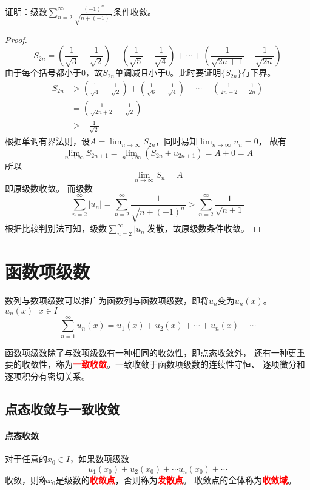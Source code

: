 \begin{example}
    证明：级数$\displaystyle\sum_{n=2}^\infty \frac{(-1)^n}{\sqrt{n + (-1)^n}}$条件收敛。
\end{example}
\begin{proof}
    \[
        S_{2n}
        = \left(\frac{1}{\sqrt{3}} - \frac{1}{\sqrt{2}}\right)
        + \left(\frac{1}{\sqrt{5}}-\frac{1}{\sqrt{4}}\right)
        + \cdots
        + \left(\frac{1}{\sqrt{2n+1}} - \frac{1}{\sqrt{2n}}\right)
    \]
    由于每个括号都小于$0$，故$S_{2n}$单调减且小于$0$。此时要证明$\{S_{2n}\}$有下界。
    \begin{align*}
        S_{2n}
         & > \left(\frac{1}{\sqrt{4}} - \frac{1}{\sqrt{2}}\right)
        + \left(\frac{1}{\sqrt{6}}-\frac{1}{\sqrt{4}}\right)
        + \cdots
        + \left(\frac{1}{2n+2} - \frac{1}{2n}\right)              \\
         & =
        \left(\frac{1}{\sqrt{2n+2}} - \frac{1}{\sqrt{2}}\right)   \\
         & > -\frac{1}{\sqrt{2}}
    \end{align*}
    根据单调有界法则，设$\displaystyle A = \lim_{n\to\infty} S_{2n}$，同时易知$\displaystyle \lim_{n\to\infty} u_n = 0$，
    故有
    \[ \lim_{n\to\infty} S_{2n+1} = \lim_{n\to\infty} (S_{2n} +u_{2n+1}) = A + 0 = A \]
    所以
    \[ \lim_{n\to\infty} S_n = A \]
    即原级数收敛。
    而级数
    \[
        \sum_{n=2}^\infty |u_n|
        =
        \sum_{n=2}^\infty \frac{1}{\sqrt{n+(-1)^n}}
        >
        \sum_{n=2}^\infty \frac{1}{\sqrt{n+1}}
    \]
    根据比较判别法可知，级数$\displaystyle\sum_{n=2}^\infty |u_n|$发散，故原级数条件收敛。
\end{proof}

\section{函数项级数}
数列与数项级数可以推广为函数列与函数项级数，即将$u_n$变为$u_n(x)$。${u_n(x)\,|\,x\in I}$
\[ \sum_{n=1}^\infty u_n(x) = u_1(x) + u_2(x) + \cdots + u_n(x) + \cdots \]

函数项级数除了与数项级数有一种相同的收敛性，即点态收敛外，
还有一种更重要的收敛性，称为\textcolor{red}{\textbf{\textsf{一致收敛}}}。一致收敛于函数项级数的连续性守恒、
逐项微分和逐项积分有密切关系。

\subsection{点态收敛与一致收敛}
\paragraph{点态收敛}
对于任意的$x_0\in I$，如果数项级数
\[ u_1(x_0) + u_2(x_0) + \cdots u_n(x_0) + \cdots \]
收敛，则称$x_0$是级数的\textcolor{red}{\textbf{\textsf{收敛点}}}，否则称为\textcolor{red}{\textbf{\textsf{发散点}}}。
收敛点的全体称为\textcolor{red}{\textbf{\textsf{收敛域}}}。

